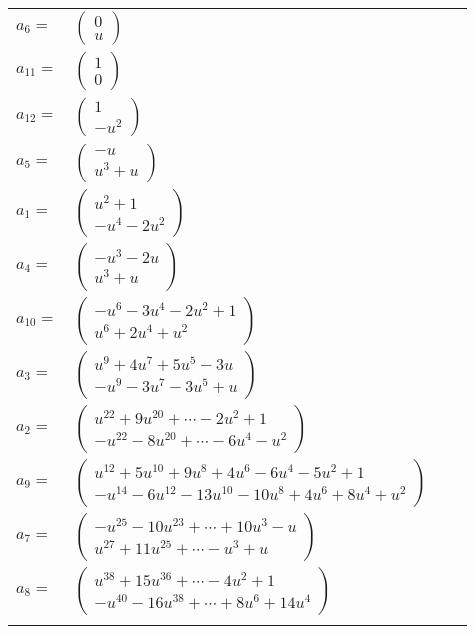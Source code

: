 \documentclass[1p]{elsarticle_modified}
\theoremstyle{definition}
\begin{document}
\begin{tabular}{m{7pt} m{180pt} m{7pt} m{180pt} }
\flushright $a_{6}=$&$\begin{pmatrix}0\\u\end{pmatrix}$ \\
\flushright $a_{11}=$&$\begin{pmatrix}1\\0\end{pmatrix}$ \\
\flushright $a_{12}=$&$\begin{pmatrix}1\\- u^2\end{pmatrix}$ \\
\flushright $a_{5}=$&$\begin{pmatrix}- u\\u^3+u\end{pmatrix}$ \\
\flushright $a_{1}=$&$\begin{pmatrix}u^2+1\\- u^4-2 u^2\end{pmatrix}$ \\
\flushright $a_{4}=$&$\begin{pmatrix}- u^3-2 u\\u^3+u\end{pmatrix}$ \\
\flushright $a_{10}=$&$\begin{pmatrix}- u^6-3 u^4-2 u^2+1\\u^6+2 u^4+u^2\end{pmatrix}$ \\
\flushright $a_{3}=$&$\begin{pmatrix}u^9+4 u^7+5 u^5-3 u\\- u^9-3 u^7-3 u^5+u\end{pmatrix}$ \\
\flushright $a_{2}=$&$\begin{pmatrix}u^{22}+9 u^{20}+\cdots-2 u^2+1\\- u^{22}-8 u^{20}+\cdots-6 u^4- u^2\end{pmatrix}$ \\
\flushright $a_{9}=$&$\begin{pmatrix}u^{12}+5 u^{10}+9 u^8+4 u^6-6 u^4-5 u^2+1\\- u^{14}-6 u^{12}-13 u^{10}-10 u^8+4 u^6+8 u^4+u^2\end{pmatrix}$ \\
\flushright $a_{7}=$&$\begin{pmatrix}- u^{25}-10 u^{23}+\cdots+10 u^3- u\\u^{27}+11 u^{25}+\cdots- u^3+u\end{pmatrix}$ \\
\flushright $a_{8}=$&$\begin{pmatrix}u^{38}+15 u^{36}+\cdots-4 u^2+1\\- u^{40}-16 u^{38}+\cdots+8 u^6+14 u^4\end{pmatrix}$\\&\end{tabular}
\end{document}
